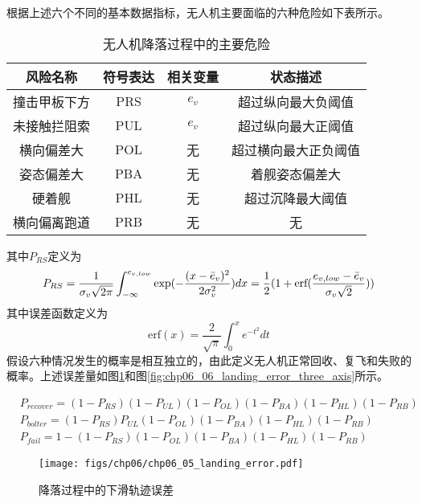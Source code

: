 根据上述六个不同的基本数据指标，无人机主要面临的六种危险如下表所示。

\begin{table}[ht]
	\centering
	\caption{无人机降落过程中的主要危险}
	\begin{tabular}{cccc}
		\hline
		\textbf{风险名称} & \textbf{符号表达} & \textbf{相关变量} & \textbf{状态描述}       \\ \hline
		撞击甲板下方 & PRS  & $e_v$ & 超过纵向最大负阈值  \\
		未接触拦阻索 & PUL  & $e_v$ & 超过纵向最大正阈值  \\
		横向偏差大  & POL  & 无   & 超过横向最大正负阈值 \\
		姿态偏差大  & PBA  & 无    & 着舰姿态偏差大    \\
		硬着舰    & PHL  & 无   & 超过沉降最大阈值   \\
		横向偏离跑道 & PRB  & 无    & 无          \\  \hline
	\end{tabular}
\end{table}

其中$P_{RS}$定义为
\begin{equation}
	P_{RS}=\frac{1}{\sigma_v\sqrt{2\pi}}\int_{-\infty}^{e_{v,low}}\exp(-\frac{(x-\bar{e}_v)^2}{2\sigma_v^2})dx \\
	=\frac{1}{2}(1+\text{erf}(\frac{e_{v, low}-\bar{e}_v}{\sigma_v\sqrt{2}}))
\end{equation}
其中误差函数定义为
\begin{equation}
	\text{erf}(x)=\frac{2}{\sqrt{\pi}}\int_{0}^{x}e^{-t^2}dt
\end{equation}
假设六种情况发生的概率是相互独立的，由此定义无人机正常回收、复飞和失败的概率。上述误差量如图\ref{fig:chp06_05_landing_error}和图\ref{fig:chp06_06_landing_error_three_axis}所示。

\begin{align}
	&P_{recover}=(1-P_{RS})(1-P_{UL})(1-P_{OL})(1-P_{BA})(1-P_{HL})(1-P_{RB}) \\
	&P_{bolter}=(1-P_{RS})P_{UL}(1-P_{OL})(1-P_{BA})(1-P_{HL})(1-P_{RB}) \\
	&P_{fail}=1-(1-P_{RS})(1-P_{OL})(1-P_{BA})(1-P_{HL})(1-P_{RB})
\end{align}




\begin{figure}[!tb]
	\centering
	\texttt{[image: figs/chp06/chp06\_05\_landing\_error.pdf]}	
	\caption{降落过程中的下滑轨迹误差}
	\label{fig:chp06_05_landing_error}
\end{figure}

